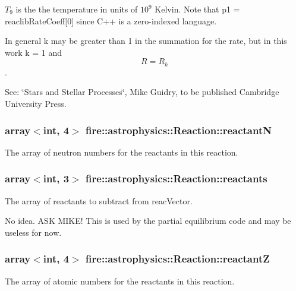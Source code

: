 $T_9$ is the the temperature in units of $10^9$ Kelvin. Note that p1 = reaclib\+Rate\+Coeff\mbox{[}0\mbox{]} since C++ is a zero-\/indexed language.

In general k may be greater than 1 in the summation for the rate, but in this work k = 1 and \[R = R_k\].

See\+: \char`\"{}\+Stars and Stellar Processes\char`\"{}, Mike Guidry, to be published Cambridge University Press. 
\subsubsection[{\texorpdfstring{reactantN}{reactantN}}]{\setlength{\rightskip}{0pt plus 5cm}array$<$int, 4$>$ fire\+::astrophysics\+::\+Reaction\+::reactantN}\hypertarget{a00022_a831dcae79d4ed842c9bbdf51ebdd137f}{}\label{a00022_a831dcae79d4ed842c9bbdf51ebdd137f}
The array of neutron numbers for the reactants in this reaction. 
\subsubsection[{\texorpdfstring{reactants}{reactants}}]{\setlength{\rightskip}{0pt plus 5cm}array$<$int, 3$>$ fire\+::astrophysics\+::\+Reaction\+::reactants}\hypertarget{a00022_ab13b0133b89c6531a1648b696324d804}{}\label{a00022_ab13b0133b89c6531a1648b696324d804}
The array of reactants to subtract from reac\+Vector.

No idea. A\+SK M\+I\+K\+E! This is used by the partial equilibrium code and may be useless for now. 
\subsubsection[{\texorpdfstring{reactantZ}{reactantZ}}]{\setlength{\rightskip}{0pt plus 5cm}array$<$int, 4$>$ fire\+::astrophysics\+::\+Reaction\+::reactantZ}\hypertarget{a00022_a74b96d4f5ff99d60adfb88b096a7e256}{}\label{a00022_a74b96d4f5ff99d60adfb88b096a7e256}
The array of atomic numbers for the reactants in this reaction. 
